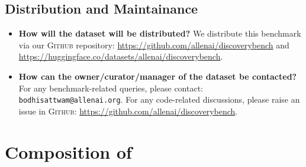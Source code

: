 \subsection{Distribution and Maintainance}
\begin{itemize}
    \item \textbf{How will the dataset will be distributed?}
    We distribute this benchmark via our \textsc{Github} repository: \url{https://github.com/allenai/discoverybench} and \url{https://huggingface.co/datasets/allenai/discoverybench}.
    \item \textbf{How can the owner/curator/manager of the dataset be contacted?} For any benchmark-related queries, please contact: \texttt{bodhisattwam@allenai.org}. For any code-related discussions, please raise an issue in \textsc{Github}: \url{https://github.com/allenai/discoverybench}.
\end{itemize}

\section{Composition of \discoverybench{}}
\label{sec:datadetails}



